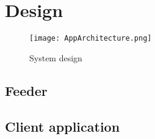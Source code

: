 \chapter{Design}

\begin{figure}[H]
    \centering
    \texttt{[image: AppArchitecture.png]}
    \caption{System design}
    \label{}
\end{figure}

\section{Feeder}

\section{Client application}